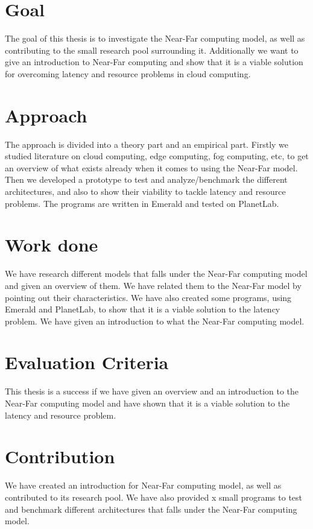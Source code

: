 \section{Goal}
The goal of this thesis is to investigate the Near-Far computing model, as well as contributing to the small research pool surrounding it. Additionally we want to give an introduction to Near-Far computing and show that it is a viable solution for overcoming latency and resource problems in cloud computing.

\section{Approach}
The approach is divided into a theory part and an empirical part. Firstly we studied literature on cloud computing, edge computing, fog computing, etc, to get an overview of what exists already when it comes to using the Near-Far model. Then we developed a prototype to test and analyze/benchmark the different architectures, and also to show their viability to tackle latency and resource problems. The programs are written in Emerald and tested on PlanetLab.


\section{Work done}
We have research different models that falls under the Near-Far computing model and given an overview of them. We have related them to the Near-Far model by pointing out their characteristics. We have also created some programs, using Emerald and PlanetLab, to show that it is a viable solution to the latency problem. We have given an introduction to what the Near-Far computing model.

\section{Evaluation Criteria}
This thesis is a success if we have given an overview and an introduction to the Near-Far computing model and have shown that it is a viable solution to the latency and resource problem.

\section{Contribution}
We have created an introduction for Near-Far computing model, as well as contributed to its research pool. We have also provided x small programs to test and benchmark different architectures that falls under the Near-Far computing model.

